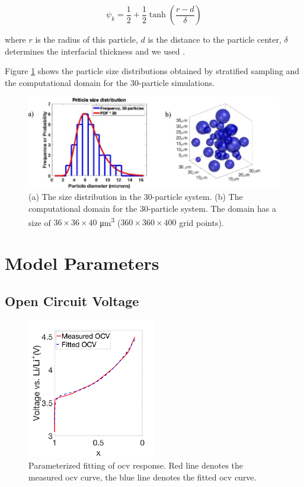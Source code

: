 \documentclass{article}
\begin{document}
\begin{equation}
  \psi_k=\frac{1}{2}+\frac{1}{2}\tanh\left(\frac{r-d}{\delta}\right)
  \label{eq:11}
\end{equation}

where $r$ is the radius of this particle, $d$ is the distance to the
particle center, $\delta$ determines the interfacial thickness and we
used  .

Figure \ref{fig:30-particle-box} shows the particle size distributions obtained by
stratified sampling\cite{parsons2017} and the computational domain for
the 30-particle simulations.

\begin{figure}
  \includegraphics[width=\textwidth]{30-particle-simulation.pdf}
  \caption{(a) The size distribution in the 30-particle system. (b) The
    computational domain for the 30-particle system. The domain has a
    size of $36 \times 36 \times 40$ \si{\micro\meter\cubed} ($360
    \times 360 \times 400$ grid points).}
  \label{fig:30-particle-box}
\end{figure}

\section{Model Parameters}

\subsection{Open Circuit Voltage}

\begin{figure}
  \includegraphics[width=0.5\textwidth]{echem-fit.pdf}
  \caption{Parameterized fitting of \gls{ocv} response. Red line
    denotes the measured \gls{ocv} curve, the blue line denotes the
    fitted \gls{ocv} curve.}
  \label{fig:ocv-response}
\end{figure}
\end{document}
